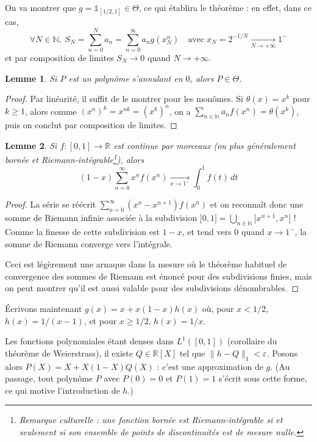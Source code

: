\documentclass[a4paper, 11pt]{article}
\def\N{\mathbb{N}}
\def\R{\mathbb{R}}
\def\Indic{\mathbb{1}}
\newtheorem*{lemma}{Lemme}
\begin{document}
On va montrer que $g = \Indic_{[1/2, 1]} \in \Theta$, ce qui établira le
théorème : en effet, dans ce cas,
\[ \forall N \in \N,\; S_N =  \sum_{n = 0}^N a_n = \sum_{n = 0}^{\infty} a_n
  g(x_N^n) \quad \text{avec}\; x_N = 2^{-1/N} \xrightarrow[N \to +\infty]{} 1^- \]
et par composition de limites $S_N \rightarrow 0$ quand $N \to +\infty$.

\begin{lemma}
  Si $P$ est un polynôme s'annulant en $0$, alors $P \in \Theta$.
\end{lemma}
\begin{proof}
  Par linéarité, il suffit de le montrer pour les monômes. Si $\theta(x) = x^k$
  pour $k \geq 1$, alors comme $(x^n)^k = x^{nk} = (x^k)^n$, on a $\sum_{n \in
    \N} a_n f(x^n) = \theta(x^k)$, puis on conclut par composition de limites.
\end{proof}

\begin{lemma}
  Si $f : [0,1] \to \R$ est continue par morceaux (ou plus généralement bornée
  et Riemann-intégrable\footnote{Remarque culturelle : une fonction bornée est
    Riemann-intégrable si et seulement si son ensemble de points de
    discontinuités est de mesure nulle.}), alors
  \[ (1-x) \sum_{n=0}^\infty x^nf(x^n) \xrightarrow[x \to 1^{-}]{} \int_0^1
    f(t)\,dt\]
\end{lemma}
\begin{proof}
  La série se réécrit $\sum_{n=0}^\infty (x^n - x^{n+1})f(x^n)$ et on reconnaît
  donc une somme de Riemann infinie associée à la subdivision $]0,1] =
  \bigcup_{n \in \N} ]x^{n+1},x^n]$ ! Comme la finesse de cette subdivision est
  $1-x$, et tend vers $0$ quand $x \to 1^-$, la somme de Riemann converge vers
  l'intégrale.
  
  Ceci est légèrement une arnaque dans la mesure où le théorème habituel de
  convergence des sommes de Riemann est énoncé pour des subdivisions finies,
  mais on peut montrer qu'il est aussi valable pour des subdivisions
  dénombrables.
\end{proof}

Écrivons maintenant $g(x) = x + x(1-x)h(x)$ où, pour $x < 1/2$, $h(x) =
1/(x-1)$, et pour $x \geq 1/2$, $h(x) = 1/x$. 

Les fonctions polynomiales étant denses dans $L^1([0,1])$ (corollaire du
théorème de Weierstrass), il existe $Q \in \R[X]$ tel que $\|h-Q\|_1 <
\varepsilon$. Posons alors $P(X) = X + X(1-X)Q(X)$ : c'est une approximation de
$g$. (Au passage, tout polynôme $P$ avec $P(0) = 0$ et $P(1) = 1$ s'écrit sous
cette forme, ce qui motive l'introduction de $h$.)
\end{document}
